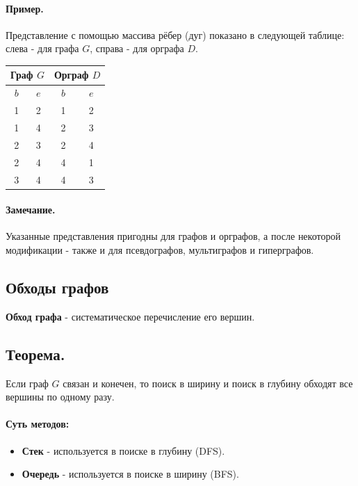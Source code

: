 {\paragraph{Пример.}
Представление с помощью массива рёбер (дуг) показано в следующей таблице: слева - для графа $G$, справа - для орграфа $D$.

\begin{center}
\begin{tabular}{|c|c||c|c|}
\hline
\multicolumn{2}{|c||}{Граф $G$} & \multicolumn{2}{c|}{Орграф $D$} \\
\hline
$b$ & $e$ & $b$ & $e$ \\
\hline
1 & 2 & 1 & 2 \\
1 & 4 & 2 & 3 \\
2 & 3 & 2 & 4 \\
2 & 4 & 4 & 1 \\
3 & 4 & 4 & 3 \\
\hline
\end{tabular}
\end{center}

\paragraph{Замечание.}
Указанные представления пригодны для графов и орграфов, а после некоторой модификации - также и для псевдографов, мультиграфов и гиперграфов.

\subsection*{Обходы графов}

\textbf{Обход графа} - систематическое перечисление его вершин.

\subsection*{Теорема.}
Если граф $G$ связан и конечен, то поиск в ширину и поиск в глубину обходят все вершины по одному разу.

\paragraph{Суть методов:}
\begin{itemize}
  \item \textbf{Стек} - используется в поиске в глубину (DFS).
  \item \textbf{Очередь} - используется в поиске в ширину (BFS).
\end{itemize}

}

